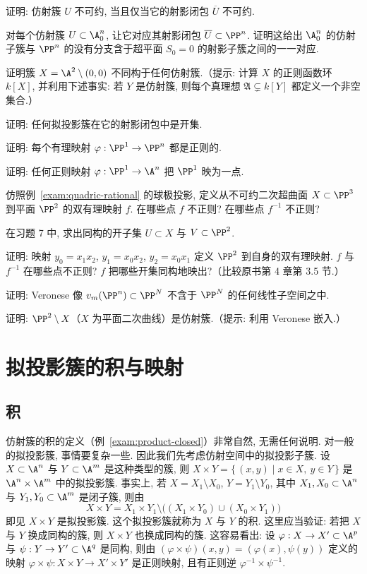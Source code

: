 \begin{compactenum}
	\item 证明: 仿射簇 $U$ 不可约, 当且仅当它的射影闭包 $\overline{U}$ 不可约.
	\item 对每个仿射簇 $U \subset \A^n_0$, 让它对应其射影闭包 $\overline{U} \subset \PP^n$. 证明这给出 $\A^n_0$ 的仿射子簇与 $\PP^n$ 的没有分支含于超平面 $S_0 = 0$ 的射影子簇之间的一一对应.
	\item 证明簇 $X = \A^2 \setminus (0,0)$ 不同构于任何仿射簇.（提示: 计算 $X$ 的正则函数环 $k[X]$, 并利用下述事实: 若 $Y$ 是仿射簇, 则每个真理想 $\mathfrak A \subsetneq k[Y]$ 都定义一个非空集合.）
	\item 证明: 任何拟投影簇在它的射影闭包中是开集.
	\item 证明: 每个有理映射 $\varphi: \PP^1 \to \PP^n$ 都是正则的.
	\item 证明: 任何正则映射 $\varphi: \PP^1 \to \A^n$ 把 $\PP^1$ 映为一点.
	\item 仿照例~\ref{exam:quadric-rational} 的球极投影, 定义从不可约二次超曲面 $X \subset \PP^3$ 到平面 $\PP^2$ 的双有理映射 $f$. 在哪些点 $f$ 不正则? 在哪些点 $f^{-1}$ 不正则?
	\item 在习题 7 中, 求出同构的开子集 $U \subset X$ 与 $V \subset \PP^2$.
	\item 证明: 映射 $y_0 = x_1 x_2$, $y_1 = x_0 x_2$, $y_2 = x_0 x_1$ 定义 $\PP^2$ 到自身的双有理映射. $f$ 与 $f^{-1}$ 在哪些点不正则? $f$ 把哪些开集同构地映出?（比较原书第 4 章第 3.5 节.）
	\item 证明: Veronese 像 $v_m(\PP^n) \subset \PP^N$ 不含于 $\PP^N$ 的任何线性子空间之中.
	\item 证明: $\PP^2 \setminus X$（$X$ 为平面二次曲线）是仿射簇.（提示: 利用 Veronese 嵌入.）
\end{compactenum}

\section{拟投影簇的积与映射}

\subsection{积}

仿射簇的积的定义（例~\ref{exam:product-closed}）非常自然, 无需任何说明. 对一般的拟投影簇, 事情要复杂一些. 因此我们先考虑仿射空间中的拟投影子簇. 设 $X \subset \A^n$ 与 $Y \subset \A^m$ 是这种类型的簇, 则 $X \times Y = \{\, (x,y) \mid x \in X,\ y \in Y \,\}$ 是 $\A^n \times \A^m$ 中的拟投影簇. 事实上, 若 $X = X_1 \setminus X_0$, $Y = Y_1 \setminus Y_0$, 其中 $X_1, X_0 \subset \A^n$ 与 $Y_1, Y_0 \subset \A^m$ 是闭子簇, 则由
\[
	X \times Y = X_1 \times Y_1 \setminus \bigl( (X_1 \times Y_0) \cup (X_0 \times Y_1) \bigr)
\]
即见 $X \times Y$ 是拟投影簇. 这个拟投影簇就称为 $X$ 与 $Y$ 的积. 这里应当验证: 若把 $X$ 与 $Y$ 换成同构的簇, 则 $X \times Y$ 也换成同构的簇. 这容易看出: 设 $\varphi: X \to X' \subset \A^p$ 与 $\psi: Y \to Y' \subset \A^q$ 是同构, 则由 $(\varphi \times \psi)(x, y) = (\varphi(x), \psi(y))$ 定义的映射 $\varphi \times \psi: X \times Y \to X' \times Y'$ 是正则映射, 且有正则逆 $\varphi^{-1} \times \psi^{-1}$.

